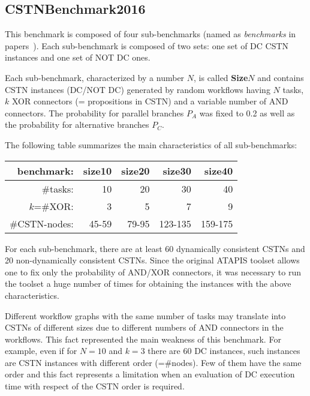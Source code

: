 \documentclass[a4paper,11pt]{article}
\begin{document}
\subsection{CSTNBenchmark2016}

This benchmark is composed of four sub-benchmarks (named as \textit{benchmarks} in papers~\cite{time2015,HunsbergerP16Icaps,CairoEtalTime2017,HunsbergerPFixed18,HunsbergerPEpsilon18,HunsbergerP20}).
Each sub-benchmark is composed of two sets: one set of DC CSTN instances and one set of NOT DC ones.

Each sub-benchmark, characterized by a number $N$, is called  \textbf{Size$N$} and contains CSTN instances (DC\slash NOT DC) generated by random workflows having $N$ tasks, $k$ XOR connectors (= propositions in CSTN) and a variable number of AND connectors.
The probability for parallel branches $P_A$ was fixed to 0.2 as well as the probability for alternative branches $P_C$.

The following table summarizes the main characteristics of all sub-benchmarks:
\begin{center}
\begin{tabular}{rrrrr}
	\hline
  \textbf{benchmark}: & \textbf{size10}	& \textbf{size20}	& \textbf{size30}	& \textbf{size40}\\
  \hline
  \#tasks: & 10 & 20 & 30 & 40 \\
  $k$=\#XOR: & 3 & 5 & 7 & 9\\%
  \#CSTN-nodes: & 45-59 &79-95& 123-135&159-175\\
  \hline
\end{tabular}
\end{center}
For each sub-benchmark, there are at least 60 dynamically consistent CSTNs and 20 non-dynamically consistent CSTNs.
Since the original ATAPIS toolset allows one to fix only the probability of AND\slash XOR connectors, it was necessary to run the toolset a huge number of times for obtaining the instances with the above characteristics.

\smallskip
Different workflow graphs with the same number of tasks may translate into CSTNs of different sizes due to different numbers of AND connectors in the workflows.
This fact represented the main weakness of this benchmark.
For example, even if for $N=10$ and $k=3$ there are 60 DC instances, such instances are CSTN instances with different order (=\#nodes). Few of them have the same order and this fact  represents a limitation when an evaluation of DC execution time with respect of the CSTN order is required.
\end{document}
